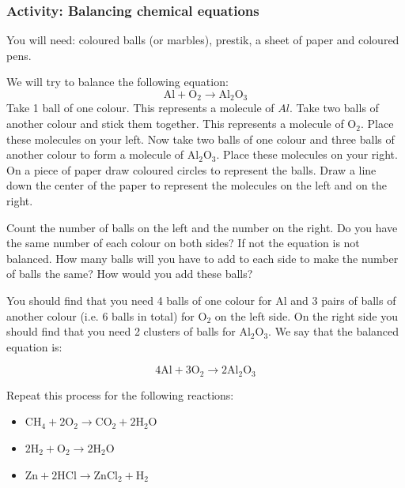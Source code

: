             \subsubsection{ Activity: Balancing chemical equations}
            \nopagebreak
            \label{m38726*eip-695}You will need: coloured balls (or marbles), prestik, a sheet of paper and coloured pens.
\par 
\label{m38726*eip-69823}We will try to balance the following equation:
\label{m38726*eid0342}\nopagebreak\noindent{}
    \begin{equation}
    \mathrm{Al}+{\mathrm{O}}_{2}\to {\mathrm{Al}}_{2}{\mathrm{O}}_{3}\tag{13.4}
      \end{equation}
Take 1 ball of one colour. This represents a molecule of $Al$. Take two balls of another colour and stick them together. This represents a molecule of ${\mathrm{O}}_{2}$. Place these molecules on your left. Now take two balls of one colour and three balls of another colour to form a molecule of ${\mathrm{Al}}_{2}{\mathrm{O}}_{3}$. Place these molecules on your right. On a piece of paper draw coloured circles to represent the balls. Draw a line down the center of the paper to represent the molecules on the left and on the right. 
\par 
\label{m38726*id23534}
Count the number of balls on the left and the number on the right. Do you have the same number of each colour on both sides? If not the equation is not balanced. How many balls will you have to add to each side to make the number of balls the same? How would you add these balls?
\par 
\label{m38726*id09873432}You should find that you need 4 balls of one colour for $\mathrm{Al}$ and 3 pairs of balls of another colour (i.e. 6 balls in total) for ${\mathrm{O}}_{2}$ on the left side. On the right side you should find that you need 2 clusters of balls for ${\mathrm{Al}}_{2}{\mathrm{O}}_{3}$.
We say that the balanced equation is:
\label{m38726*id97235}\nopagebreak\noindent{}

    \begin{equation}
    4\mathrm{Al}+3{\mathrm{O}}_{2}\to 2{\mathrm{Al}}_{2}{\mathrm{O}}_{3}\tag{13.5}
      \end{equation}
\par 
\label{m38726*id570943}Repeat this process for the following reactions:
\label{m38726*id08342}\begin{itemize}[noitemsep]
            \item 
${\mathrm{CH}}_{4}+2{\mathrm{O}}_{2}\to {\mathrm{CO}}_{2}+2{\mathrm{H}}_{2}\mathrm{O}$
\item 
$2{\mathrm{H}}_{2}+{\mathrm{O}}_{2}\to 2{\mathrm{H}}_{2}\mathrm{O}$
\item 
$\mathrm{Zn}+2\mathrm{HCl}\to {\mathrm{ZnCl}}_{2}+{\mathrm{H}}_{2}$
\end{itemize}
\par \label{m38726*uid10}
